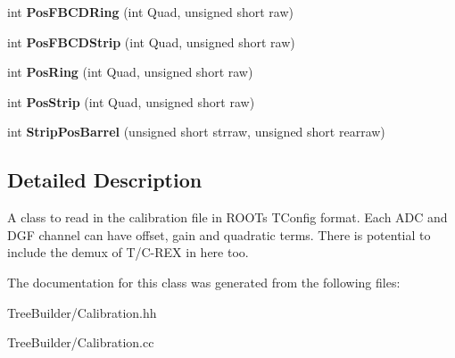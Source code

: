 \begin{DoxyCompactItemize}
int {\bfseries Pos\+F\+B\+C\+D\+Ring} (int Quad, unsigned short raw)
\item 
\mbox{\label{class_calibration_a9ee9ef612f7485f5371916bf524bb036}} 
int {\bfseries Pos\+F\+B\+C\+D\+Strip} (int Quad, unsigned short raw)
\item 
\mbox{\label{class_calibration_a240b3ac33e55af3f762d2cecc5d06b2b}} 
int {\bfseries Pos\+Ring} (int Quad, unsigned short raw)
\item 
\mbox{\label{class_calibration_a1d12aea9e2be55852b937e8be3ffbae1}} 
int {\bfseries Pos\+Strip} (int Quad, unsigned short raw)
\item 
\mbox{\label{class_calibration_af2ce93c038cdfd3e9fb1e4ffa093097c}} 
int {\bfseries Strip\+Pos\+Barrel} (unsigned short strraw, unsigned short rearraw)
\end{DoxyCompactItemize}


\subsection{Detailed Description}
A class to read in the calibration file in R\+O\+OT\textquotesingle{}s T\+Config format. Each A\+DC and D\+GF channel can have offset, gain and quadratic terms. There is potential to include the demux of T/\+C-\/\+R\+EX in here too. 

The documentation for this class was generated from the following files\+:\begin{DoxyCompactItemize}
\item 
Tree\+Builder/Calibration.\+hh\item 
Tree\+Builder/Calibration.\+cc\end{DoxyCompactItemize}
